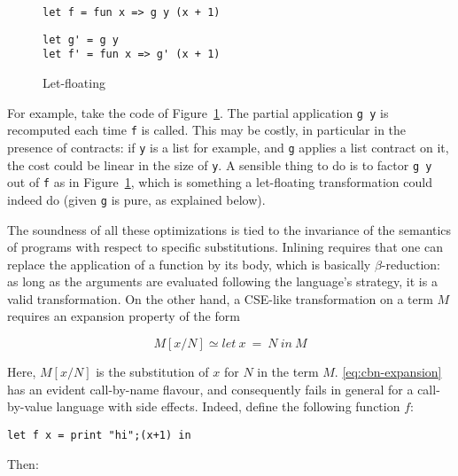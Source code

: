 \documentclass[sigplan,10pt,review,anonymous]{acmart}
\begin{document}
\begin{figure}
  \begin{center}
\begin{lstlisting}[language=nickel,title={Source program}]
let f = fun x => g y (x + 1)
\end{lstlisting}
\begin{lstlisting}[language=nickel,title={Optimized program}]
let g' = g y
let f' = fun x => g' (x + 1)
\end{lstlisting}
  \end{center}
\caption{Let-floating}
\label{fig:optimizations-let-floating-ex}
\end{figure}

For example, take the code of Figure~\ref{fig:optimizations-let-floating-ex}.
The partial application \lstinline+g y+ is recomputed each time \lstinline+f+ is
called. This may be costly, in particular in the presence of contracts: if
\lstinline+y+ is a list for example, and \lstinline+g+ applies a list contract
on it, the cost could be linear in the size of \lstinline+y+. A sensible thing
to do is to factor \lstinline+g y+ out of \lstinline+f+ as in
Figure~\ref{fig:optimizations-let-floating-ex}, which is something a
let-floating transformation could indeed do (given \lstinline+g+ is pure, as
explained below).

The soundness of all these optimizations is tied to the invariance of the
semantics of programs with respect to specific substitutions. Inlining requires
that one can replace the application of a function by its body, which is
basically $\beta$-reduction: as long as the arguments are evaluated following
the language's strategy, it is a valid transformation. On the other hand,
a CSE-like transformation on a term $M$ requires an expansion property of the form

\begin{equation}\label{eq:cbn-expansion}
M[x/N] \simeq let~x~=~N~in~M
\end{equation}

Here, $M[x/N]$ is the substitution of $x$ for $N$ in the term $M$.
\ref{eq:cbn-expansion} has an evident call-by-name flavour, and consequently
fails in general for a call-by-value language with side effects.  Indeed, define
the following function $f$:

\begin{lstlisting}[language=Nickel]
let f x = print "hi";(x+1) in 
\end{lstlisting}

Then:
\end{document}
